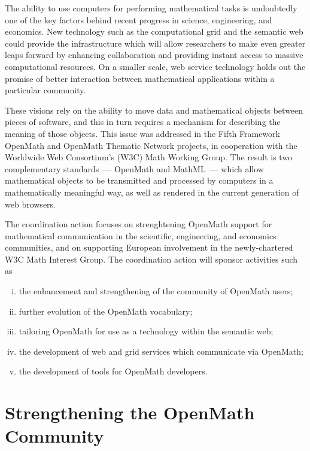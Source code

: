 \documentclass{euproposal}
\begin{document}
The ability to use computers for performing mathematical tasks is
undoubtedly one of the key factors behind recent progress in science,
engineering, and economics.  New technology such as the computational
grid and the semantic web could provide the infrastructure which will
allow researchers to make even greater leaps forward by enhancing
collaboration and providing instant access to massive computational
resources.  On a smaller scale, web service technology holds out the
promise of better interaction between mathematical applications within
a particular community.

These visions rely on the ability to move data and mathematical
objects between pieces of software, and this in turn requires a
mechanism for describing the meaning of those objects.  This issue was
addressed in the Fifth Framework OpenMath and OpenMath Thematic
Network projects, in cooperation with the Worldwide Web Consortium's
(W3C) Math Working Group.  The result is two complementary
standards~--- OpenMath and MathML~--- which allow mathematical objects
to be transmitted and processed by computers in a mathematically
meaningful way, as well as rendered in the current generation of web
browsers.

The coordination action focuses on strenghtening OpenMath support for
mathematical communication in the scientific, engineering, and
economics communities, and on supporting European involvement in the
newly-chartered W3C Math Interest Group.  The coordination action will
sponsor activities such as

\begin{enumerate}[(i)]
\item the enhancement and strengthening of the community of OpenMath
  users;
\item further evolution of the OpenMath vocabulary;
\item tailoring OpenMath for use as a technology within the semantic
  web;
\item the development of web and grid services which communicate via
  OpenMath;
\item the development of tools for OpenMath developers.
\end{enumerate}


\section{Strengthening the OpenMath Community} 
\label{community}

\end{document}
